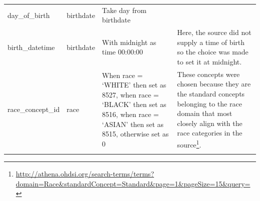 \documentclass[11pt]{book}
\let\rmarkdownfootnote\footnote%
\def\footnote{\protect\rmarkdownfootnote}
\theoremstyle{definition}
\theoremstyle{definition}
\theoremstyle{definition}
\theoremstyle{remark}
\begin{document}
\begin{longtable}[]{@{}llll@{}}
\begin{minipage}[t]{0.24\columnwidth}\raggedright
day\_of\_birth\strut
\end{minipage} & \begin{minipage}[t]{0.10\columnwidth}\raggedright
birthdate\strut
\end{minipage} & \begin{minipage}[t]{0.12\columnwidth}\raggedright
Take day from birthdate\strut
\end{minipage} & \begin{minipage}[t]{0.42\columnwidth}\raggedright
\strut
\end{minipage}\tabularnewline
\begin{minipage}[t]{0.24\columnwidth}\raggedright
birth\_datetime\strut
\end{minipage} & \begin{minipage}[t]{0.10\columnwidth}\raggedright
birthdate\strut
\end{minipage} & \begin{minipage}[t]{0.12\columnwidth}\raggedright
With midnight as time 00:00:00\strut
\end{minipage} & \begin{minipage}[t]{0.42\columnwidth}\raggedright
Here, the source did not supply a time of birth so the choice was made to set it at midnight.\strut
\end{minipage}\tabularnewline
\begin{minipage}[t]{0.24\columnwidth}\raggedright
race\_concept\_id\strut
\end{minipage} & \begin{minipage}[t]{0.10\columnwidth}\raggedright
race\strut
\end{minipage} & \begin{minipage}[t]{0.12\columnwidth}\raggedright
When race = `WHITE' then set as 8527, when race = `BLACK' then set as 8516, when race = `ASIAN' then set as 8515, otherwise set as 0\strut
\end{minipage} & \begin{minipage}[t]{0.42\columnwidth}\raggedright
These concepts were chosen because they are the standard concepts belonging to the race domain that most closely align with the race categories in the source\footnote{\url{http://athena.ohdsi.org/search-terms/terms?domain=Race\&standardConcept=Standard\&page=1\&pageSize=15\&query=}}.\strut
\end{minipage}\tabularnewline
\begin{minipage}[t]{0.24\columnwidth}\raggedright

\end{minipage}
\end{longtable}
\end{document}
